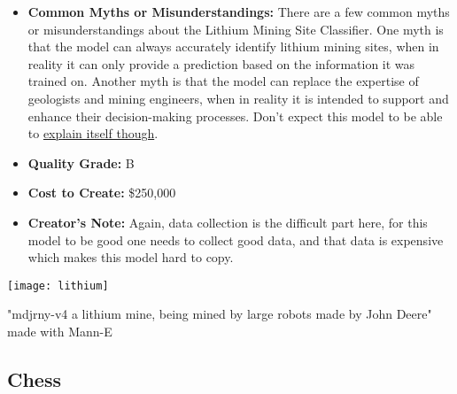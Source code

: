 \begin{itemize}
\item \textbf{Common Myths or Misunderstandings:} There are a few common myths or misunderstandings about the Lithium Mining Site Classifier. One myth is that the model can always accurately identify lithium mining sites, when in reality it can only provide a prediction based on the information it was trained on. Another myth is that the model can replace the expertise of geologists and mining engineers, when in reality it is intended to support and enhance their decision-making processes. Don't expect this model to be able to \hyperref[sec:explain]{explain itself though}.
    \item \textbf{Quality Grade:} B
    \item \textbf{Cost to Create:} \$250,000
    \item \textbf{Creator's Note:} Again, data collection is the difficult part here, for this model to be good one needs to collect good data, and that data is expensive which makes this model hard to copy. 
\end{itemize}

\begin{marginfigure}[-5.5cm]
        \texttt{[image: lithium]}
        \caption{"mdjrny-v4 a lithium mine, being mined by large robots made by John Deere" made with Mann-E}
\end{marginfigure}

\subsection{Chess}

